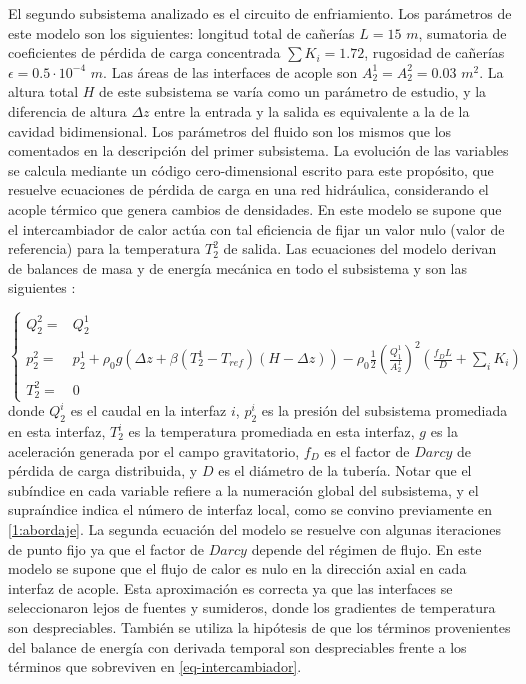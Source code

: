 El segundo subsistema analizado es el circuito de enfriamiento.
Los parámetros de este modelo son los siguientes:
longitud total de cañerías $L=15$ $m$, 
sumatoria de coeficientes de pérdida de carga concentrada $\sum K_i=1.72$, 
rugosidad de cañerías $\epsilon=0.5\cdot 10^{-4}$ $m$.
Las áreas de las interfaces de acople son $A_2^1=A_2^2=0.03$ $m^2$.
La altura total $H$ de este subsistema se varía como un parámetro de estudio,
y la diferencia de altura $\Delta z$ entre la entrada y la salida es equivalente a la de la cavidad bidimensional.
Los parámetros del fluido son los mismos que los comentados en la descripción del primer subsistema.
La evolución de las variables se calcula mediante un código cero-dimensional escrito para este propósito,
que resuelve ecuaciones de pérdida de carga en una red hidráulica, considerando el acople térmico que genera cambios de densidades.
En este modelo se supone que el intercambiador de calor actúa con tal eficiencia de fijar un valor nulo (valor de referencia) para la temperatura $T_2^2$ de salida.
Las ecuaciones del modelo derivan de balances de masa y de energía mecánica en todo el subsistema y son las siguientes \cite{iedelchik}:
 
\begin{equation}
\left\{ \begin{array}{rl}
Q_2^{2} =& Q_2^{1} \\ [0.2cm]
p_2^2 =& p_2^1 + \rho_0 g \left ( \Delta z + \beta (T_2^1 - T_{ref}) (H-\Delta z) \right ) - \rho_0 \frac{1}{2} \left( \frac{Q_1^1}{A_2^1} \right)^2  \left( \frac {f_D L} {D} + \sum_i K_i \right)  \\ [0.2cm]
T_2^2 =& 0
\label{eq-intercambiador}
\end{array}
\right.
\end{equation}
donde $Q_2^i$ es el caudal en la interfaz $i$,
$p_2^i$ es la presión del subsistema promediada en esta interfaz,
$T_2^i$ es la temperatura promediada en esta interfaz,
$g$ es la aceleración generada por el campo gravitatorio,
$f_D$ es el factor de $Darcy$ de pérdida de carga distribuida,
y $D$ es el diámetro de la tubería.
Notar que el subíndice en cada variable refiere a la numeración global del subsistema, y el supraíndice indica el número de interfaz local,
como se convino previamente en \ref{1:abordaje}.
La segunda ecuación del modelo se resuelve con algunas iteraciones de punto fijo ya que el factor de $Darcy$ depende del régimen de flujo.
En este modelo se supone que el flujo de calor es nulo en la dirección axial en cada interfaz de acople.
Esta aproximación es correcta ya que las interfaces se seleccionaron lejos de fuentes y sumideros, donde los gradientes de temperatura son despreciables.
También se utiliza la hipótesis de que los términos provenientes del balance de energía con derivada temporal son despreciables frente a los términos que sobreviven en \ref{eq-intercambiador}.

